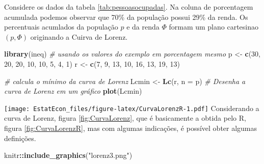 \documentclass[
]{book}
\newenvironment{Shaded}{\begin{snugshade}}{\end{snugshade}}
\newcommand{\CommentTok}[1]{\textcolor[rgb]{0.56,0.35,0.01}{\textit{#1}}}
\newcommand{\DataTypeTok}[1]{\textcolor[rgb]{0.13,0.29,0.53}{#1}}
\newcommand{\DecValTok}[1]{\textcolor[rgb]{0.00,0.00,0.81}{#1}}
\newcommand{\KeywordTok}[1]{\textcolor[rgb]{0.13,0.29,0.53}{\textbf{#1}}}
\newcommand{\NormalTok}[1]{#1}
\newcommand{\OperatorTok}[1]{\textcolor[rgb]{0.81,0.36,0.00}{\textbf{#1}}}
\newcommand{\StringTok}[1]{\textcolor[rgb]{0.31,0.60,0.02}{#1}}
\begin{document}
Considere os dados da tabela \ref{tab:pessoasocupadas}. Na coluna de porcentagem acumulada podemos observar que 70\% da população possui 29\% da renda. Os percentuais acumlados da população \(p\) e da renda \(\Phi\) formam um plano cartesinao \((p,\Phi)\) originando a Cuirva de Lorenz.

\begin{Shaded}
\begin{Highlighting}[]
\KeywordTok{library}\NormalTok{(ineq)}
\CommentTok{# usando os valores do exemplo em porcentagem mesmo}
\NormalTok{p <-}\StringTok{ }\KeywordTok{c}\NormalTok{(}\DecValTok{30}\NormalTok{, }\DecValTok{20}\NormalTok{, }\DecValTok{20}\NormalTok{, }\DecValTok{10}\NormalTok{, }\DecValTok{10}\NormalTok{, }\DecValTok{5}\NormalTok{, }\DecValTok{4}\NormalTok{, }\DecValTok{1}\NormalTok{)}
\NormalTok{r <-}\StringTok{ }\KeywordTok{c}\NormalTok{(}\DecValTok{7}\NormalTok{, }\DecValTok{9}\NormalTok{, }\DecValTok{13}\NormalTok{, }\DecValTok{10}\NormalTok{, }\DecValTok{16}\NormalTok{, }\DecValTok{13}\NormalTok{, }\DecValTok{19}\NormalTok{, }\DecValTok{13}\NormalTok{)}

\CommentTok{# calcula o mínimo da curva de Lorenz}
\NormalTok{Lcmin <-}\StringTok{ }\KeywordTok{Lc}\NormalTok{(r, }\DataTypeTok{n =}\NormalTok{ p)}
\CommentTok{# Desenha a curva de Lorenz em um gráfico}
\KeywordTok{plot}\NormalTok{(Lcmin)}
\end{Highlighting}
\end{Shaded}

\texttt{[image: EstatEcon\_files/figure-latex/CurvaLorenzR-1.pdf]}
Considerando a curva de Lorenz, figura \ref{fig:CurvaLorenz}, que é basicamente a obtida pelo R, figura \ref{fig:CurvaLorenzR}, mas com algumas indicações, é possível obter algumas definições.

\begin{Shaded}
\begin{Highlighting}[]
\NormalTok{knitr}\OperatorTok{::}\KeywordTok{include_graphics}\NormalTok{(}\StringTok{"lorenz3.png"}\NormalTok{)}
\end{Highlighting}
\end{Shaded}
\end{document}
